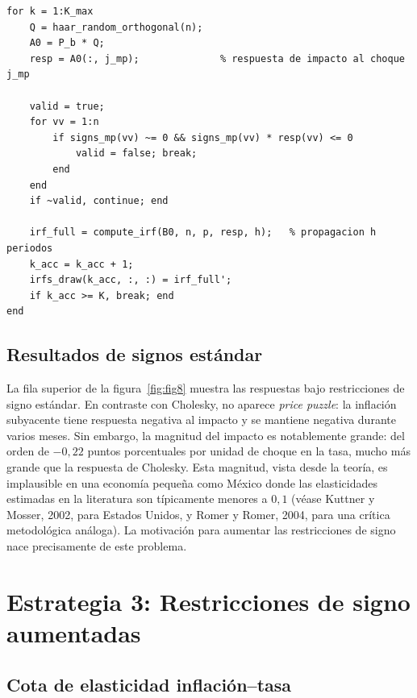 \documentclass[11pt,letterpaper]{article}
\begin{document}
\begin{lstlisting}[style=matlabstyle, caption={Verificación de signos y propagación IRF}]
for k = 1:K_max
    Q = haar_random_orthogonal(n);
    A0 = P_b * Q;
    resp = A0(:, j_mp);              % respuesta de impacto al choque j_mp

    valid = true;
    for vv = 1:n
        if signs_mp(vv) ~= 0 && signs_mp(vv) * resp(vv) <= 0
            valid = false; break;
        end
    end
    if ~valid, continue; end

    irf_full = compute_irf(B0, n, p, resp, h);   % propagacion h periodos
    k_acc = k_acc + 1;
    irfs_draw(k_acc, :, :) = irf_full';
    if k_acc >= K, break; end
end
\end{lstlisting}

\subsection{Resultados de signos estándar}

La fila superior de la figura~\ref{fig:fig8} muestra las respuestas bajo restricciones de signo estándar. En contraste con Cholesky, no aparece \textit{price puzzle}: la inflación subyacente tiene respuesta negativa al impacto y se mantiene negativa durante varios meses. Sin embargo, la magnitud del impacto es notablemente grande: del orden de $-0{,}22$ puntos porcentuales por unidad de choque en la tasa, mucho más grande que la respuesta de Cholesky. Esta magnitud, vista desde la teoría, es implausible en una economía pequeña como México donde las elasticidades estimadas en la literatura son típicamente menores a $0{,}1$ (véase Kuttner y Mosser, 2002, para Estados Unidos, y Romer y Romer, 2004, para una crítica metodológica análoga). La motivación para aumentar las restricciones de signo nace precisamente de este problema.

\section{Estrategia 3: Restricciones de signo aumentadas}\label{sec:aumentadas}

\subsection{Cota de elasticidad inflación--tasa}
\end{document}
